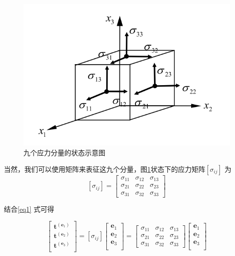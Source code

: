 \documentclass[12pt, a4paper]{ctexart}
\begin{document}
\begin{figure}
	\centering
	\includegraphics[scale=1.0]{22.png}
	\caption{九个应力分量的状态示意图}
	\label{fig22}
\end{figure}

当然，我们可以使用矩阵来表征这九个分量，图\ref{fig22}状态下的应力矩阵$ [ \sigma_{i j} ] $ 为
\begin{equation}
\left[\sigma_{i j}\right]=\left[ \begin{array}{ccc}{\sigma_{11}} & {\sigma_{12}} & {\sigma_{13}} \\ {\sigma_{21}} & {\sigma_{22}} & {\sigma_{23}} \\ {\sigma_{31}} & {\sigma_{32}} & {\sigma_{33}}\end{array}\right]
\end{equation}

结合\eqref{eq1} 式可得

\begin{equation}
\left[\begin{array}{c}
\mathbf{t}^{\left(\mathbf{e}_{1}\right)} \\
\mathbf{t}^{\left(\mathbf{e}_{2}\right)} \\
\mathbf{t}^{\left(\mathbf{e}_{3}\right)} \\
\end{array}
\right] = 
\left[\sigma_{i j}\right]
\left[
\begin{array}{c}
\mathbf{e}_{1} \\
\mathbf{e}_{2} \\
\mathbf{e}_{3} \\
\end{array}
\right]
 =\left[ \begin{array}{ccc}{\sigma_{11}} & {\sigma_{12}} & {\sigma_{13}} \\ {\sigma_{21}} & {\sigma_{22}} & {\sigma_{23}} \\ {\sigma_{31}} & {\sigma_{32}} & {\sigma_{33}}\end{array}\right]
\left[
\begin{array}{c}
\mathbf{e}_{1} \\
\mathbf{e}_{2} \\
\mathbf{e}_{3} \\
\end{array}
\right]
\end{equation}
\end{document}
